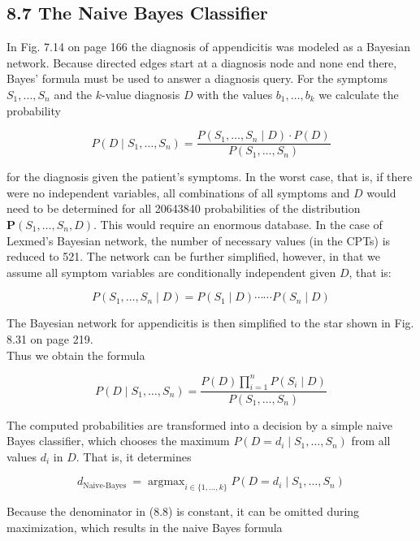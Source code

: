 \documentclass[10pt]{article}
\begin{document}
\subsection*{8.7 The Naive Bayes Classifier}
In Fig. 7.14 on page 166 the diagnosis of appendicitis was modeled as a Bayesian network. Because directed edges start at a diagnosis node and none end there, Bayes’ formula must be used to answer a diagnosis query. For the symptoms $S_{1}, \ldots, S_{n}$ and the $k$-value diagnosis $D$ with the values $b_{1}, \ldots, b_{k}$ we calculate the probability

$$
P\left(D \mid S_{1}, \ldots, S_{n}\right)=\frac{P\left(S_{1}, \ldots, S_{n} \mid D\right) \cdot P(D)}{P\left(S_{1}, \ldots, S_{n}\right)}
$$

for the diagnosis given the patient's symptoms. In the worst case, that is, if there were no independent variables, all combinations of all symptoms and $D$ would need to be determined for all 20643840 probabilities of the distribution $\boldsymbol{P}\left(S_{1}, \ldots, S_{n}, D\right)$. This would require an enormous database. In the case of Lexmed's Bayesian network, the number of necessary values (in the CPTs) is reduced to 521. The network can be further simplified, however, in that we assume all symptom variables are conditionally independent given $D$, that is:

$$
P\left(S_{1}, \ldots, S_{n} \mid D\right)=P\left(S_{1} \mid D\right) \cdots \cdots P\left(S_{n} \mid D\right)
$$

The Bayesian network for appendicitis is then simplified to the star shown in Fig. 8.31 on page 219.\\
Thus we obtain the formula


\begin{equation*}
P\left(D \mid S_{1}, \ldots, S_{n}\right)=\frac{P(D) \prod_{i=1}^{n} P\left(S_{i} \mid D\right)}{P\left(S_{1}, \ldots, S_{n}\right)} \tag{8.8}
\end{equation*}


The computed probabilities are transformed into a decision by a simple naive Bayes classifier, which chooses the maximum $P\left(D=d_{i} \mid S_{1}, \ldots, S_{n}\right)$ from all values $d_{i}$ in $D$. That is, it determines

$$
d_{\text {Naive-Bayes }}=\operatorname{argmax}_{i \in\{1, \ldots, k\}} P\left(D=d_{i} \mid S_{1}, \ldots, S_{n}\right)
$$

Because the denominator in (8.8) is constant, it can be omitted during maximization, which results in the naive Bayes formula
\end{document}

